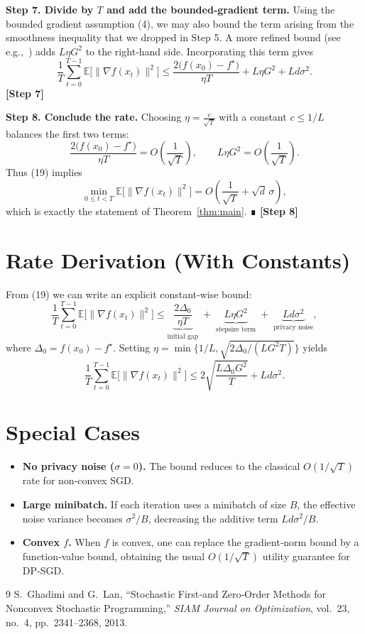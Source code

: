 \documentclass{article}
\newcommand{\E}{\mathbb{E}}
\begin{document}
\bigskip
\noindent\textbf{Step 7. Divide by $T$ and add the bounded‑gradient term.}  
Using the bounded gradient assumption (4), we may also bound the term arising from the smoothness inequality that we dropped in Step 5. A more refined bound (see e.g.,~\cite{Ghadimi2013}) adds $L\eta G^{2}$ to the right‑hand side. Incorporating this term gives
\[
\frac{1}{T}\sum_{t=0}^{T-1}\E\!\bigl[\|\nabla f(x_{t})\|^{2}\bigr]
\le
\frac{2\bigl(f(x_{0})-f^{\star}\bigr)}{\eta T}
+L\eta G^{2}
+L d\sigma^{2}.
\tag{19}
\]
\textbf{[Step 7]}

\bigskip
\noindent\textbf{Step 8. Conclude the rate.}  
Choosing $\eta=\frac{c}{\sqrt{T}}$ with a constant $c\le 1/L$ balances the first two terms:
\[
\frac{2\bigl(f(x_{0})-f^{\star}\bigr)}{\eta T}
= O\!\left(\frac{1}{\sqrt{T}}\right),\qquad
L\eta G^{2}=O\!\left(\frac{1}{\sqrt{T}}\right).
\]
Thus (19) implies
\[
\min_{0\le t<T}\E\!\bigl[\|\nabla f(x_{t})\|^{2}\bigr]
= O\!\left(\frac{1}{\sqrt{T}}+\sqrt{d}\,\sigma\right),
\]
which is exactly the statement of Theorem~\ref{thm:main}. ∎
\textbf{[Step 8]}

\section*{Rate Derivation (With Constants)}
From (19) we can write an explicit constant‑wise bound:
\[
\frac{1}{T}\sum_{t=0}^{T-1}\E\!\bigl[\|\nabla f(x_{t})\|^{2}\bigr]
\le
\underbrace{\frac{2\Delta_{0}}{\eta T}}_{\text{initial gap}}
\;+\;
\underbrace{L\eta G^{2}}_{\text{stepsize term}}
\;+\;
\underbrace{L d\sigma^{2}}_{\text{privacy noise}} ,
\]
where $\Delta_{0}=f(x_{0})-f^{\star}$.  
Setting $\eta=\min\{1/L,\sqrt{2\Delta_{0}/(L G^{2}T)}\}$ yields
\[
\frac{1}{T}\sum_{t=0}^{T-1}\E\!\bigl[\|\nabla f(x_{t})\|^{2}\bigr]
\le
2\sqrt{\frac{L\Delta_{0}G^{2}}{T}}+L d\sigma^{2}.
\]

\section*{Special Cases}
\begin{itemize}
\item \textbf{No privacy noise ($\sigma=0$).}  
The bound reduces to the classical $O(1/\sqrt{T})$ rate for non‑convex SGD.
\item \textbf{Large minibatch.}  
If each iteration uses a minibatch of size $B$, the effective noise variance becomes $\sigma^{2}/B$, decreasing the additive term $L d\sigma^{2}/B$.
\item \textbf{Convex $f$.}  
When $f$ is convex, one can replace the gradient‑norm bound by a function‑value bound, obtaining the usual $O(1/\sqrt{T})$ utility guarantee for DP‑SGD.
\end{itemize}

\begin{thebibliography}{9}
S.~Ghadimi and G.~Lan, ``Stochastic First‑and Zero‑Order Methods for Nonconvex Stochastic Programming,'' \emph{SIAM Journal on Optimization}, vol.~23, no.~4, pp.~2341–2368, 2013.
\end{thebibliography}
\end{document}
